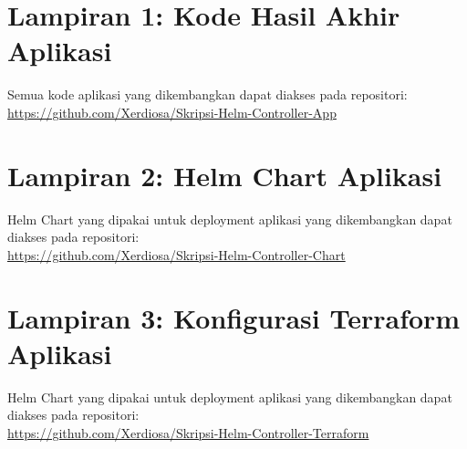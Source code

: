 \chapter*{Lampiran 1: Kode Hasil Akhir Aplikasi}
\label{appendix:hasilAplikasi}
Semua kode aplikasi yang dikembangkan dapat diakses pada repositori:\\
\url{https://github.com/Xerdiosa/Skripsi-Helm-Controller-App}

\chapter*{Lampiran 2: Helm Chart Aplikasi}
\label{appendix:helmChartAplikasi}
Helm Chart yang dipakai untuk deployment aplikasi yang dikembangkan dapat diakses pada repositori:\\
\url{https://github.com/Xerdiosa/Skripsi-Helm-Controller-Chart}

\chapter*{Lampiran 3: Konfigurasi Terraform Aplikasi}
\label{appendix:terraformAplikasi}
Helm Chart yang dipakai untuk deployment aplikasi yang dikembangkan dapat diakses pada repositori:\\
\url{https://github.com/Xerdiosa/Skripsi-Helm-Controller-Terraform}